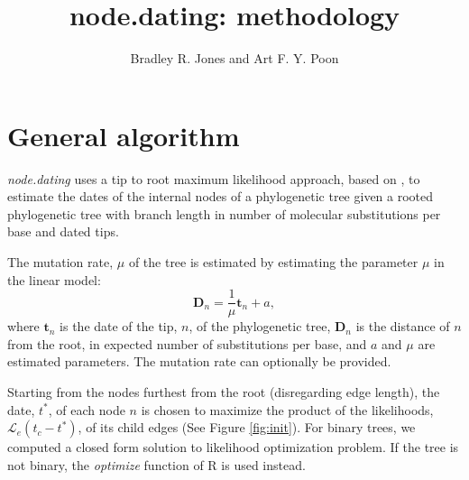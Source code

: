 \documentclass[12pt]{article}
\title{node.dating: methodology}
\author{Bradley R. Jones and Art F. Y. Poon}
\newcommand{\code}[1]{\emph{#1}}
\begin{document}
	\maketitle
	
	\section{General algorithm}	
		\code{node.dating} uses a tip to root maximum likelihood approach, based on \cite{Felsenstein81, TipDates}, to estimate the dates of the internal nodes of a phylogenetic tree given a rooted phylogenetic tree with branch length in number of molecular substitutions per base and dated tips.
		
		The mutation rate, $\mu$ of the tree is estimated by estimating the parameter $\mu$ in the linear model:
		\[\mathbf{D}_n = \frac{1}{\mu}\mathbf{t}_n + a,\]
		where $\mathbf{t}_n$ is the date of the tip, $n$, of the phylogenetic tree, $\mathbf{D}_n$ is the distance of $n$ from the root, in expected number of substitutions per base, and $a$ and $\mu$ are estimated parameters.
		The mutation rate can optionally be provided.
		
		Starting from the nodes furthest from the root (disregarding edge length), the date, $t^*$, of each node $n$ is chosen to maximize the product of the likelihoods, $\mathcal{L}_e(t_c - t^*)$, of its child edges (See Figure  \ref{fig:init}). For binary trees, we computed a closed form solution to likelihood optimization problem. If the tree is not binary, the \code{optimize} function of R is used instead.
		
\end{document}
